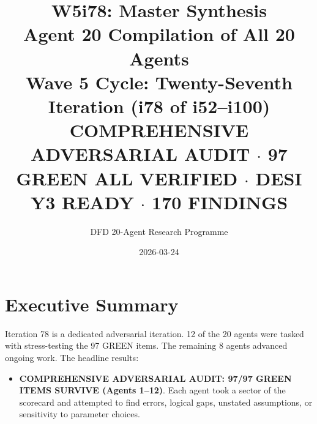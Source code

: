 \documentclass[11pt,a4paper]{article}
\title{\Huge W5i78: Master Synthesis\\[12pt]
\Large Agent 20 Compilation of All 20 Agents\\[6pt]
\large Wave 5 Cycle: Twenty-Seventh Iteration (i78 of i52--i100)\\[6pt]
\normalsize \textbf{COMPREHENSIVE ADVERSARIAL AUDIT} $\cdot$ 97 GREEN ALL VERIFIED $\cdot$ DESI Y3 READY $\cdot$ 170 FINDINGS}
\author{DFD 20-Agent Research Programme}
\date{2026-03-24}
\begin{document}
\maketitle

\section{Executive Summary}

Iteration 78 is a dedicated adversarial iteration. 12 of the 20 agents were tasked with stress-testing the 97 GREEN items. The remaining 8 agents advanced ongoing work. The headline results:

\begin{itemize}
\item \textbf{COMPREHENSIVE ADVERSARIAL AUDIT: 97/97 GREEN ITEMS SURVIVE (Agents 1--12)}. Each agent took a sector of the scorecard and attempted to find errors, logical gaps, unstated assumptions, or sensitivity to parameter choices.


\end{itemize}
\end{document}
